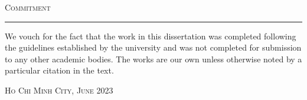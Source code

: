 \thispagestyle{empty}
\vspace*{3cm}
\noindent\Huge\textsc{Commitment}\\
\normalsize
\noindent\rule[2pt]{\textwidth}{0.8pt}
\hspace*{5cm}

We vouch for the fact that the work in this dissertation was completed following the guidelines established by the university and was not completed for submission to any other academic bodies. The works are our own unless otherwise noted by a particular citation in the text.
	
\hfill \textsc{Ho Chi Minh City, June 2023}
	
\cleardoublepage
